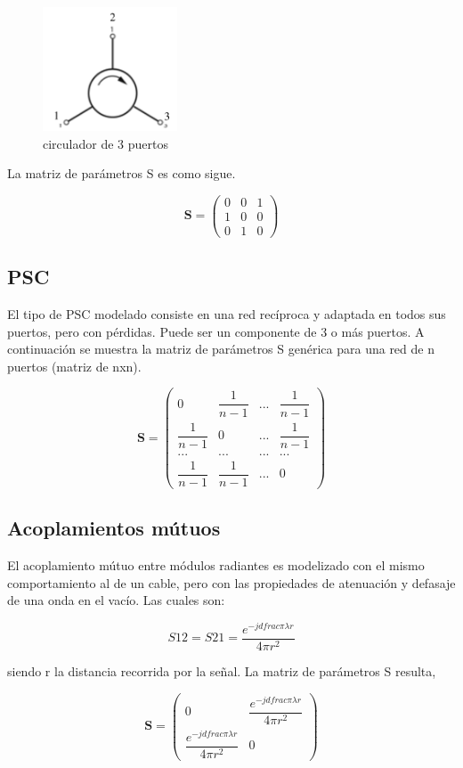 \begin{figure}[H]
 \centering
 \includegraphics[width=4cm]{gfx/circulator.png}
 \caption{circulador de 3 puertos}
 \label{fig:circulator}
\end{figure}

La matriz de parámetros S es como sigue.

$$
\mathbf{S} = \begin{pmatrix} 0 & 0 & 1\\1 & 0 & 0\\0 & 1 & 0\end{pmatrix}
$$


\subsection{PSC}

El tipo de PSC modelado consiste en una red recíproca y adaptada en todos sus puertos, pero con pérdidas. Puede ser un 
componente de 3 o más puertos. A continuación se muestra la matriz de parámetros S genérica para una red de n puertos 
(matriz de nxn).

$$
\mathbf{S} = \begin{pmatrix} 0 & \dfrac{1}{n-1} & ... & \dfrac{1}{n-1}\\
							 \dfrac{1}{n-1} & 0 & ... & \dfrac{1}{n-1}\\
							 ... & ... & ... & ... \\
							 \dfrac{1}{n-1} & \dfrac{1}{n-1} & ... & 0 \end{pmatrix}
$$

\subsection{Acoplamientos mútuos}

El acoplamiento mútuo entre módulos radiantes es modelizado con el mismo comportamiento al de un cable, pero con las 
propiedades de atenuación y defasaje de una onda en el vacío. Las cuales son:

\begin{equation}
	S12 = S21 = \dfrac{e^{-jdfrac{\pi}{\lambda}r}}{4\pi r^2}
\end{equation}

siendo r la distancia recorrida por la señal. La matriz de parámetros S resulta,

$$
\mathbf{S} = \begin{pmatrix} 0 & \dfrac{e^{-jdfrac{\pi}{\lambda}r}}{4\pi r^2}\\\dfrac{e^{-jdfrac{\pi}{\lambda}r}}{4\pi r^2} & 0\end{pmatrix}
$$

